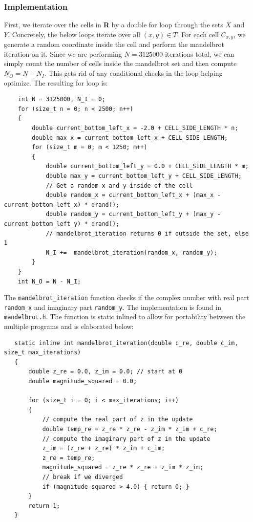 \documentclass{article}
\begin{document}
\subsubsection{Implementation}
First, we iterate over the cells in \textbf{R} by a double for loop 
through the sets $X$ and $Y$. Concretely, the below loops iterate over all $(x, y) \in T$.
For each cell $C_{x, y}$, we generate a random coordinate inside the cell and perform the 
mandelbrot iteration on it. Since we are performing $N = 3125000$ iterations total, we 
can simply count the number of cells inside the mandelbrot set and then compute $N_O = N - N_I$. 
This gets rid of any conditional checks in the loop helping optimize.
The resulting for loop is:
\begin{lstlisting}
    int N = 3125000, N_I = 0;
    for (size_t n = 0; n < 2500; n++)
    {
        double current_bottom_left_x = -2.0 + CELL_SIDE_LENGTH * n;
        double max_x = current_bottom_left_x + CELL_SIDE_LENGTH;
        for (size_t m = 0; m < 1250; m++)
        {
            double current_bottom_left_y = 0.0 + CELL_SIDE_LENGTH * m;
            double max_y = current_bottom_left_y + CELL_SIDE_LENGTH;
            // Get a random x and y inside of the cell
            double random_x = current_bottom_left_x + (max_x - current_bottom_left_x) * drand();
            double random_y = current_bottom_left_y + (max_y - current_bottom_left_y) * drand();
            // mandelbrot_iteration returns 0 if outside the set, else 1
            N_I +=  mandelbrot_iteration(random_x, random_y);
        }
    }
    int N_O = N - N_I; 
\end{lstlisting}
The \texttt{mandelbrot\_iteration} function checks if the complex number with real part 
\texttt{random\_x} and imaginary part \texttt{random\_y}. The implementation is 
found in \texttt{mandelbrot.h}. The function is static inlined to allow for portability 
between the multiple programs and is elaborated below:
\begin{lstlisting}
   static inline int mandelbrot_iteration(double c_re, double c_im, size_t max_iterations)
   {
       double z_re = 0.0, z_im = 0.0; // start at 0
       double magnitude_squared = 0.0;
   
       for (size_t i = 0; i < max_iterations; i++)
       {
           // compute the real part of z in the update
           double temp_re = z_re * z_re - z_im * z_im + c_re; 
           // compute the imaginary part of z in the update
           z_im = (z_re + z_re) * z_im + c_im; 
           z_re = temp_re;
           magnitude_squared = z_re * z_re + z_im * z_im;
           // break if we diverged
           if (magnitude_squared > 4.0) { return 0; }
       }
       return 1;
   } 
\end{lstlisting}
\end{document}
